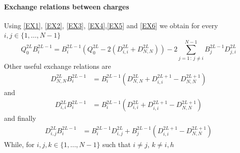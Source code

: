 \documentclass[10pt]{article}
\numberwithin{equation}{section}
\numberwithin{equation}{subsection}
\begin{document}
\paragraph{Exchange relations between charges}
Using \eqref{EX1}, \eqref{EX2}, \eqref{EX3}, \eqref{EX4},\eqref{EX5} and \eqref{EX6} we obtain for every $i,j\in\{1,\ldots,N-1\}$ 
\begin{equation}\label{ExQ0B-charges}
Q_{0}^{2L}B_{i}^{2L-1}=B_{i}^{2L-1}\left(Q_{0}^{2L}-2(D_{i,i}^{2L}+D_{N,N}^{2L})\right)-2\sum_{j=1\,:\,j\neq i}^{N-1}B_{j}^{2L-1}D_{j,i}^{2L}
\end{equation}
Other useful exchange relations are 
\begin{equation}\label{ExDNB-charges}
\begin{split}
D_{N,N}^{2L}B_{i}^{2L-1}&=B_{i}^{2L-1}\left(D_{N,N}^{2L}+D_{i,i}^{2L+1}-D_{N,N}^{2L+1}\right)%
\end{split}
\end{equation}
and
\begin{equation}\label{ExDiB-charges}
\begin{split}
D_{i,i}^{2L}B_{i}^{2L-1}&=B_{i}^{2L-1}\left(D_{i,i}^{2L}+D_{i,i}^{2L+1}-D_{N,N}^{2L+1}\right)%
\end{split}
\end{equation}
and finally
\begin{equation}\label{ExDijB-charges}
\begin{split}
D_{i,j}^{2L}B_{i}^{2L-1}&=B_{i}^{2L-1}D_{i,j}^{2L}+B_{j}^{2L-1}\left(D_{i,i}^{2L+1}-D_{N,N}^{2L+1}\right)%
\end{split}
\end{equation}
While, for $i,j,k\in\{1,\ldots,N-1\}$ such that $i\neq j$, $k\neq i,h$
\end{document}

